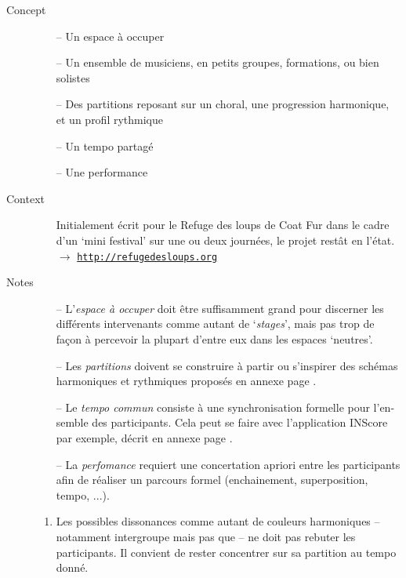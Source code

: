 \begin{description}
\item[Concept] \hfill 
\begin{itemize}
\item[--] Un espace \`{a} occuper
\item[--] Un ensemble de musiciens, en petits groupes, formations, ou bien solistes  
\item[--] Des partitions reposant sur un choral, une progression harmonique, et un profil rythmique
\item[--] Un tempo partagé 
\item[--] Une performance 
\end{itemize}
\bigskip
\item[Context] \hfill 
\begin{itemize}
\item[] Initialement \'{e}crit pour le Refuge des loups de Coat Fur dans le cadre d'un `mini festival' sur une ou deux journ\'{e}es, le projet rest\^{a}t en l'\'{e}tat. \\ $\rightarrow$ \href{http://refugedesloups.org}{\texttt{\small http://refugedesloups.org}}
\end{itemize}
\bigskip
\item[Notes] \hfill 
\begin{itemize}
\item[--] L'\textit{espace \`{a} occuper} doit \^{e}tre suffisamment grand pour discerner les diff\'{e}rents intervenants comme autant de `\textit{stages}', mais pas trop de fa\c{c}on \`{a} percevoir la plupart d'entre eux dans les espaces `neutres'.
\item[--] Les \textit{partitions} doivent se construire \`{a} partir ou s'inspirer des sch\'{e}mas harmoniques et rythmiques propos\'{e}s en annexe page \pageref{dlcscore}.
\item[--] Le \textit{tempo commun} consiste \`{a} une synchronisation formelle pour l'en- semble des participants. Cela peut se faire avec l'application INScore par exemple, d\'{e}crit en annexe page \pageref{inscore}.
\item[--] La \textit{perfomance} requiert une concertation apriori entre les participants afin de r\'{e}aliser un parcours formel (enchainement, superposition, tempo, ...).
\end{itemize}

\begin{enumerate}

\item Les possibles dissonances comme autant de couleurs harmoniques -- notamment intergroupe mais pas que -- ne doit pas rebuter les participants. Il convient de rester concentrer sur sa partition au tempo donn\'{e}.


\end{enumerate}
\end{description}
